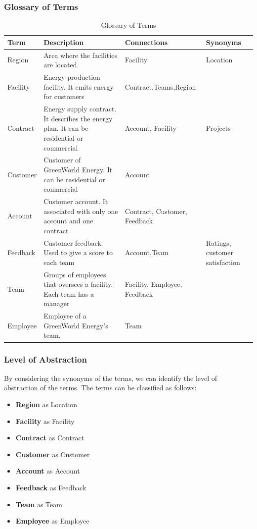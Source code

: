 \subsubsection{Glossary of Terms}
\begin{table}[H]
    \renewcommand{\arraystretch}{1.3} %
    \begin{tabularx}{\textwidth}{|X|X|X|X|}
    \hline
    \textbf{Term}& \textbf{Description}  & \textbf{Connections}    & \textbf{Synonyms}     \\ \hline
    Region      & Area where the facilities are located. & Facility     & Location \\ \hline
    Facility     & Energy production facility. It emits energy for customers      & Contract,Teams,Region         &\\ \hline
    Contract     & Energy supply contract. It describes the energy plan. It can be residential or commercial & Account, Facility     & Projects        \\ \hline
    Customer     & Customer of GreenWorld Energy. It can be residential or commercial       & Account    &        \\ \hline
    Account      & Customer account. It associated with only one account and one contract & Contract, Customer, Feedback     &        \\ \hline
    Feedback     & Customer feedback. Used to give a score to each team       & Account,Team     &         Ratings, customer satisfaction \\\hline
    Team        & Groups of employees that oversees a facility. Each team has a manager       & Facility, Employee, Feedback     &        \\ \hline
    Employee     & Employee of a GreenWorld Energy's team.      & Team     &        \\ \hline
    \end{tabularx}
    \caption{Glossary of Terms}
    \end{table}
\newpage
\subsubsection{Level of Abstraction}
By considering the synonyms of the terms, we can identify the level of abstraction of the terms. The terms can be classified as follows:
\begin{itemize}
    \item \textbf{Region} as Location
    \item \textbf{Facility} as Facility
    \item \textbf{Contract} as Contract
    \item \textbf{Customer} as Customer
    \item \textbf{Account} as Account
    \item \textbf{Feedback} as Feedback
    \item \textbf{Team} as Team
    \item \textbf{Employee} as Employee
\end{itemize}


